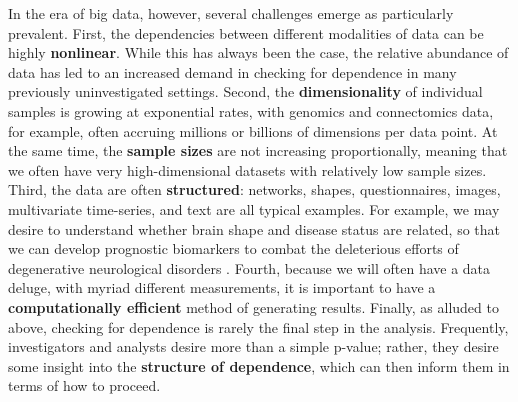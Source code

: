 \documentclass[11pt]{article}
\begin{document}
In the era of big data, however, several challenges emerge as particularly prevalent.
%
First, the dependencies between different modalities of data can be highly \textbf{nonlinear}.  While this has always been the case, the relative abundance of data has led to an increased demand in checking for dependence in many previously uninvestigated settings.
%
Second, the \textbf{dimensionality} of individual samples is growing at exponential rates, with genomics and connectomics data, for example, often accruing millions or billions of dimensions per data point. At the same time, the \textbf{sample sizes} are not increasing proportionally, meaning that we often have very high-dimensional datasets with relatively low sample sizes.
%
Third, the data are often \textbf{structured}: networks, shapes, questionnaires, images, multivariate time-series, and text are all typical examples.
%
%
%
For example, we may desire to understand whether brain shape and disease status are related, so that we can develop prognostic biomarkers to combat the deleterious efforts of degenerative neurological disorders \cite{ParkEtAl2008}.
%
Fourth, because we will often have a data deluge, with myriad different measurements, it is important to have a  \textbf{computationally efficient} method of generating results.
%
Finally, as alluded to above, checking for dependence is rarely the final step in the analysis.  Frequently, investigators and analysts desire more than a simple p-value; rather, they desire some insight into the  \textbf{structure of dependence}, which can then inform them in terms of how to proceed.
\end{document}
